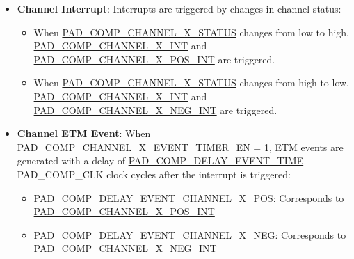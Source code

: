 \documentclass[main\_\_EN.tex]{subfiles}
\begin{document}
\begin{itemize}
    If the current status is high, \hyperref[fielddesc:PADCOMPLIMITCNT]{PAD\_COMP\_LIMIT\_CNT} consecutive low levels need to be sampled before switching to low. Conversely, if the current status is low, \hyperref[fielddesc:PADCOMPLIMITCNT]{PAD\_COMP\_LIMIT\_CNT} consecutive high levels need to be sampled before the channel status switches to high.

    After PAD\_COMP\_OUT transitions once and triggers an interrupt, \hyperref[fielddesc:PADCOMPFILTERCNT]{PAD\_COMP\_FILTER\_CNT} configures a debounce time in PAD\_COMP\_CLK clock cycles, during which no new interrupt is triggered. This suppresses duplicate interrupts caused by the input voltage jittering around the reference voltage. \hyperref[fielddesc:PADCOMPLIMITCNT]{PAD\_COMP\_LIMIT\_CNT} and \hyperref[fielddesc:PADCOMPFILTERCNT]{PAD\_COMP\_FILTER\_CNT} work together: the former filters glitches during sampling, and the latter suppresses duplicate interrupts after one has been triggered.

    \item \textbf{Channel Interrupt}: Interrupts are triggered by changes in channel status:
            \begin{itemize}
                \item When \hyperref[fielddesc:PADCOMPCHANNEL1STATUS]{PAD\_COMP\_CHANNEL\_X\_STATUS} changes from low to high, \hyperref[int:PADCOMPnALLINT]{PAD\_COMP\_CHANNEL\_X\_INT} and \hyperref[int:PADCOMPnPOSINT]{PAD\_COMP\_CHANNEL\_X\_POS\_INT} are triggered.
                \item When \hyperref[fielddesc:PADCOMPCHANNEL1STATUS]{PAD\_COMP\_CHANNEL\_X\_STATUS} changes from high to low, \hyperref[int:PADCOMPnALLINT]{PAD\_COMP\_CHANNEL\_X\_INT} and \hyperref[int:PADCOMPnNEGINT]{PAD\_COMP\_CHANNEL\_X\_NEG\_INT} are triggered.
            \end{itemize}
            
   \item \textbf{Channel ETM Event}: When \hyperref[fielddesc:PADCOMPCHANNEL1EVENTTIMEREN]{PAD\_COMP\_CHANNEL\_X\_EVENT\_TIMER\_EN} = 1, ETM events are generated with a delay of \hyperref[fielddesc:PADCOMPDELAYEVENTTIME]{PAD\_COMP\_DELAY\_EVENT\_TIME} PAD\_COMP\_CLK clock cycles after the interrupt is triggered:
            \begin{itemize}
                \item PAD\_COMP\_DELAY\_EVENT\_CHANNEL\_X\_POS: Corresponds to \hyperref[int:PADCOMPnPOSINT]{PAD\_COMP\_CHANNEL\_X\_POS\_INT}
                \item PAD\_COMP\_DELAY\_EVENT\_CHANNEL\_X\_NEG: Corresponds to \hyperref[int:PADCOMPnNEGINT]{PAD\_COMP\_CHANNEL\_X\_NEG\_INT}
            \end{itemize}


\end{itemize}
\end{document}
